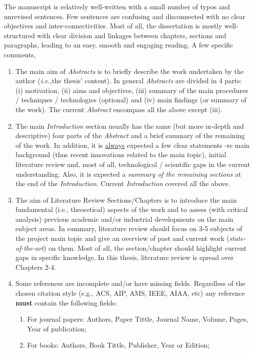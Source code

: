 \documentclass[14pt,twoside]{report}
\newcommand{\ie}{{\it i.e.,}}
\begin{document}
The manuscript is relatively well-written with a small number of typos and unrevised sentences. Few sentences are confusing and disconnected with no clear objectives and inter-connectivities. Most of all, the dissertation is mostly well-structured with clear division and linkages between chapters, sections and paragraphs, leading to an easy, smooth and engaging reading. A few specific comments,
\begin{enumerate}
%
\item The main aim of {\it Abstracts} is to briefly describe the work undertaken by the author (\ie the thesis' content). In general {\it Abstracts} are divided in 4 parts: (i) motivation, (ii) aims and objectives, (iii) summary of the main procedures / techniques / technologies (optional) and (iv) main findings (or summary of the work). The current {\it Abstract} encompass all the above except (iii).
%
\item The main {\it Introduction} section usually has the same (but more in-depth and descriptive) four parts of the {\it Abstract} and a brief summary of the remaining of the work. In addition, it is \underline{always} expected a few clear statements -re main background (thus recent innovations related to the main topic), initial literature review and, most of all, technological / scientific gaps in the current understanding. Also, it is expected a {\it summary of the remaining sections} at the end of the {\it Introduction}.  Current {\it Introduction} covered all the above.
%
\item The aim of Literature Review Sections/Chapters is to introduce the main fundamental (i.e., theoretical) aspects of the work and to assess (with critical analysis) previous academic and/or industrial developments on the main subject areas. In summary, literature review should focus on 3-5 subjects of the project main topic and give an overview of past and current work ({\it state-of-the-art}) on them. Most of all, the section/chapter should highlight current gaps in specific knowledge. In this thesis, literature review is spread over Chapters 2-4.
%
\item Some references are incomplete and/or have missing fields. Regardless of the chosen citation style (e.g., ACS, AIP, AMS, IEEE, AIAA, etc) any reference {\bf must} contain the following fields: 
\begin{enumerate}
\item For journal papers: Authors, Paper Tittle, Journal Name, Volume, Pages, Year of publication;
\item For books: Authors, Book Tittle, Publisher, Year or Edition;

\end{enumerate}
\end{enumerate}
\end{document}
